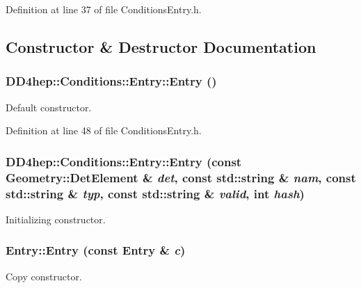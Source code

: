 Definition at line 37 of file ConditionsEntry.h.

\subsection{Constructor \& Destructor Documentation}
\hypertarget{class_d_d4hep_1_1_conditions_1_1_entry_a31e26e63b90fd0bb0d2772e5614f8afd}{
\subsubsection[{Entry}]{\setlength{\rightskip}{0pt plus 5cm}DD4hep::Conditions::Entry::Entry ()}}
\label{class_d_d4hep_1_1_conditions_1_1_entry_a31e26e63b90fd0bb0d2772e5614f8afd}


Default constructor. 

Definition at line 48 of file ConditionsEntry.h.\hypertarget{class_d_d4hep_1_1_conditions_1_1_entry_ae825ef5d2bb9cbde929430f57005062a}{
\subsubsection[{Entry}]{\setlength{\rightskip}{0pt plus 5cm}DD4hep::Conditions::Entry::Entry (const {\bf Geometry::DetElement} \& {\em det}, \/  const std::string \& {\em nam}, \/  const std::string \& {\em typ}, \/  const std::string \& {\em valid}, \/  int {\em hash})}}
\label{class_d_d4hep_1_1_conditions_1_1_entry_ae825ef5d2bb9cbde929430f57005062a}


Initializing constructor. \hypertarget{class_d_d4hep_1_1_conditions_1_1_entry_ae50bfee4f9aea43616b374050530cd57}{
\subsubsection[{Entry}]{\setlength{\rightskip}{0pt plus 5cm}Entry::Entry (const {\bf Entry} \& {\em c})}}
\label{class_d_d4hep_1_1_conditions_1_1_entry_ae50bfee4f9aea43616b374050530cd57}


Copy constructor. 

